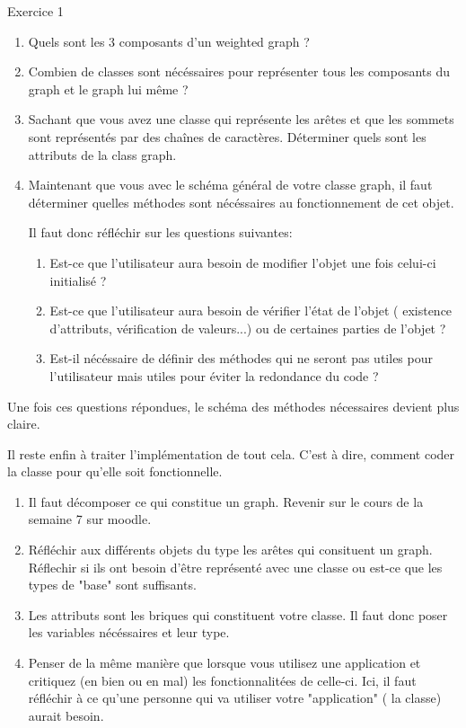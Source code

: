 \begin{Exercice} Exercice 1\\
    \begin{enumerate}
        \item Quels sont les 3 composants d'un weighted graph ?
        \item Combien de classes sont nécéssaires pour représenter tous les composants du graph et le graph lui même ?
        \item Sachant que vous avez une classe qui représente les arêtes et que les sommets sont représentés par des chaînes de caractères. Déterminer quels sont les attributs de la class graph.
        \item Maintenant que vous avec le schéma général de votre classe graph, il faut déterminer quelles méthodes sont nécéssaires au fonctionnement de cet objet.
        
        Il faut donc réfléchir sur les questions suivantes:
            \begin{enumerate}
            \item Est-ce que l'utilisateur aura besoin de modifier l'objet une fois celui-ci initialisé ?
            \item Est-ce que l'utilisateur aura besoin de vérifier l'état de l'objet ( existence d'attributs, vérification de valeurs...) ou de certaines parties de l'objet ?
            \item Est-il nécéssaire de définir des méthodes qui ne seront pas utiles pour l'utilisateur mais utiles pour éviter la redondance du code ?
            \end{enumerate}
    \end{enumerate}
    Une fois ces questions répondues, le schéma des méthodes nécessaires devient plus claire.
    
    Il reste enfin à traiter l'implémentation de tout cela. C'est à dire, comment coder la classe pour qu'elle soit fonctionnelle.
\begin{conseil}
   \begin{enumerate}
   \item Il faut décomposer ce qui constitue un graph. Revenir sur le cours de la semaine 7 sur moodle.
   \item Réfléchir aux différents objets du type les arêtes qui consituent un graph. Réflechir si ils ont besoin d'être représenté avec une classe ou est-ce que les types de "base" sont suffisants.
   \item Les attributs sont les briques qui constituent votre classe. Il faut donc poser les variables nécéssaires et leur type.
   \item Penser de la même manière que lorsque vous utilisez une application et critiquez (en bien ou en mal) les fonctionnalitées de celle-ci. Ici, il faut réfléchir à ce qu'une personne qui va utiliser votre "application" ( la classe) aurait besoin.
   \end{enumerate}
\end{conseil}
    

\end{Exercice}

